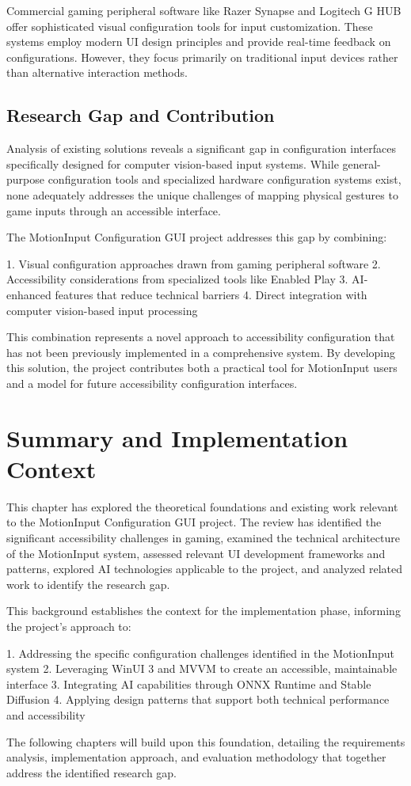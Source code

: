 Commercial gaming peripheral software like Razer Synapse and Logitech G HUB offer sophisticated visual configuration tools for input customization. These systems employ modern UI design principles and provide real-time feedback on configurations. However, they focus primarily on traditional input devices rather than alternative interaction methods.

\subsection{Research Gap and Contribution}
Analysis of existing solutions reveals a significant gap in configuration interfaces specifically designed for computer vision-based input systems. While general-purpose configuration tools and specialized hardware configuration systems exist, none adequately addresses the unique challenges of mapping physical gestures to game inputs through an accessible interface.

The MotionInput Configuration GUI project addresses this gap by combining:

1. Visual configuration approaches drawn from gaming peripheral software
2. Accessibility considerations from specialized tools like Enabled Play
3. AI-enhanced features that reduce technical barriers
4. Direct integration with computer vision-based input processing

This combination represents a novel approach to accessibility configuration that has not been previously implemented in a comprehensive system. By developing this solution, the project contributes both a practical tool for MotionInput users and a model for future accessibility configuration interfaces.

\section{Summary and Implementation Context}
This chapter has explored the theoretical foundations and existing work relevant to the MotionInput Configuration GUI project. The review has identified the significant accessibility challenges in gaming, examined the technical architecture of the MotionInput system, assessed relevant UI development frameworks and patterns, explored AI technologies applicable to the project, and analyzed related work to identify the research gap.

This background establishes the context for the implementation phase, informing the project's approach to:

1. Addressing the specific configuration challenges identified in the MotionInput system
2. Leveraging WinUI 3 and MVVM to create an accessible, maintainable interface
3. Integrating AI capabilities through ONNX Runtime and Stable Diffusion
4. Applying design patterns that support both technical performance and accessibility

The following chapters will build upon this foundation, detailing the requirements analysis, implementation approach, and evaluation methodology that together address the identified research gap.